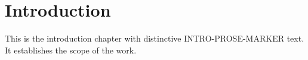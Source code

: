 \chapter{Introduction}\label{ch:intro}
This is the introduction chapter with distinctive INTRO-PROSE-MARKER text.
It establishes the scope of the work.
